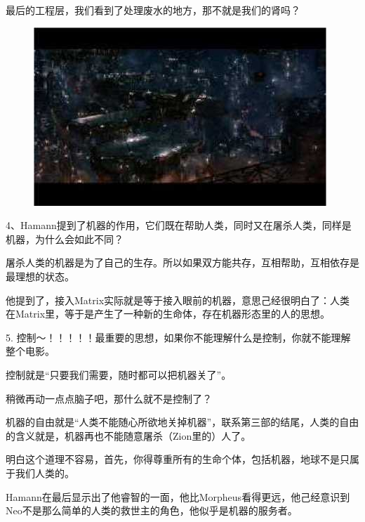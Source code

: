 \documentclass{ctexart}
\begin{document}
最后的工程层，我们看到了处理废水的地方，那不就是我们的肾吗？

\begin{figure}[htb]
\centering
\includegraphics[width=0.5\linewidth]{fig/read_reloaded-52}
\end{figure}

4、Hamann提到了机器的作用，它们既在帮助人类，同时又在屠杀人类，同样是机器，为什么会如此不同？

屠杀人类的机器是为了自己的生存。所以如果双方能共存，互相帮助，互相依存是最理想的状态。

他提到了，接入Matrix实际就是等于接入眼前的机器，意思己经很明白了：人类在Matrix里，等于是产生了一种新的生命体，存在机器形态里的人的思想。

5. 控制～！！！！！最重要的思想，如果你不能理解什么是控制，你就不能理解整个电影。

控制就是“只要我们需要，随时都可以把机器关了”。

稍微再动一点点脑子吧，那什么就不是控制了？

机器的自由就是“人类不能随心所欲地关掉机器”，联系第三部的结尾，人类的自由的含义就是，机器再也不能随意屠杀（Zion里的）人了。

明白这个道理不容易，首先，你得尊重所有的生命个体，包括机器，地球不是只属于我们人类的。

Hamann在最后显示出了他睿智的一面，他比Morpheus看得更远，他己经意识到Neo不是那么简单的人类的救世主的角色，他似乎是机器的服务者。
\end{document}
